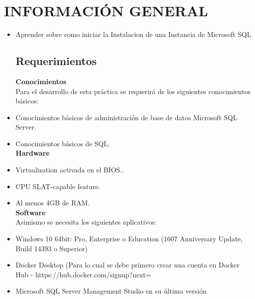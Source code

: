 \section{INFORMACIÓN GENERAL} 

\begin{itemize}
\subsection{Objetivos:}

	 \item Aprender sobre como iniciar la Instalacion  de una Instancia de Microsoft SQL
\subsection{Requerimientos}

	
	\textbf{Conocimientos}\\
	 
	
    Para el desarrollo de esta práctica se requerirá de los siguientes        	  conocimientos básicos:
	\item Conocimientos básicos de administración de base de datos 	  			 Microsoft SQL Server.
	\item Conocimientos básicos de SQL.\\
	
	\textbf{Hardware}\\
	
	\item Virtualization activada en el BIOS..
	\item CPU SLAT-capable feature.
	\item Al menos 4GB de RAM.\\
	
	 \textbf{Software}\\
	
	Asimismo se necesita los siguientes aplicativos:
	\item Windows 10 64bit: Pro, Enterprise o Education (1607 Anniversary 			  Update, Build 14393 o Superior)
	\item Docker Desktop (Para lo cual se debe primero crear una cuenta en 			  Docker Hub - https://hub.docker.com/signup?next=%
	\item Microsoft SQL Server Management Studio en su última versión



\end{itemize}